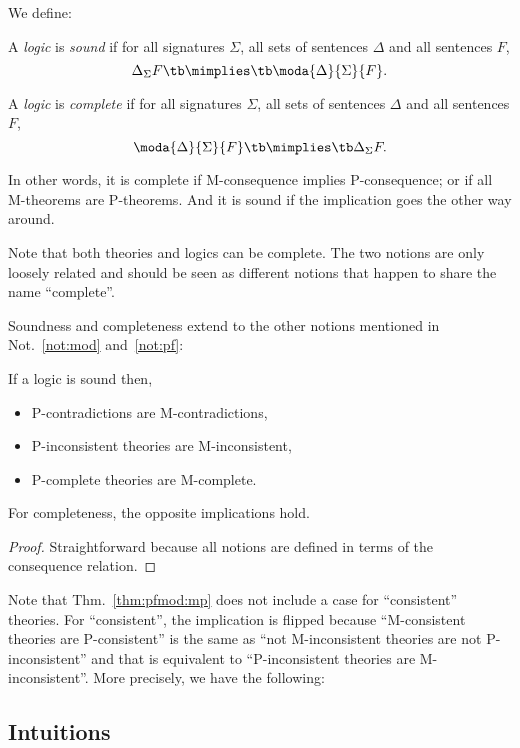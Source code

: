 We define:
\begin{definition}
A \emph{logic} is \emph{sound} if for all signatures $\Sigma$, all sets of sentences $\Delta$ and all sentences $F$,
\[\Delta\der_\Sigma F \tb\mimplies\tb \moda{\Delta}{\Sigma}{F}.\]

A \emph{logic} is \emph{complete} if for all signatures $\Sigma$, all sets of sentences $\Delta$ and all sentences $F$,
\[\moda{\Delta}{\Sigma}{F} \tb\mimplies\tb \Delta\der_\Sigma F.\]
\end{definition}

In other words, it is complete if M-consequence implies P-consequence; or if all M-theorems are P-theorems.
And it is sound if the implication goes the other way around.

\begin{notation}
Note that both theories and logics can be complete. The two notions are only loosely related and should be seen as different notions that happen to share the name ``complete''.
\end{notation}

Soundness and completeness extend to the other notions mentioned in Not.~\ref{not:mod} and~\ref{not:pf}:
\begin{theorem}\label{thm:pfmod:mp}
If a logic is sound then,
\begin{itemize}
	\item P-contradictions are M-contradictions,
	\item P-inconsistent theories are M-inconsistent,
	\item P-complete theories are M-complete.
\end{itemize}
For completeness, the opposite implications hold.
\end{theorem}
\begin{proof}
Straightforward because all notions are defined in terms of the consequence relation.
\end{proof}

Note that Thm.~\ref{thm:pfmod:mp} does not include a case for ``consistent'' theories. For ``consistent'', the implication is flipped because ``M-consistent theories are P-consistent'' is the same as ``not M-inconsistent theories are not P-inconsistent'' and that is equivalent to ``P-inconsistent theories are M-inconsistent''. More precisely, we have the following:

\subsection{Intuitions}

